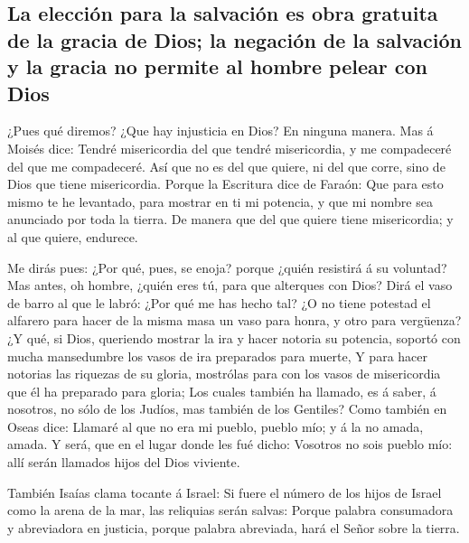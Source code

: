 \hypertarget{la-elecciuxf3n-para-la-salvaciuxf3n-es-obra-gratuita-de-la-gracia-de-dios-la-negaciuxf3n-de-la-salvaciuxf3n-y-la-gracia-no-permite-al-hombre-pelear-con-dios}{%
\subsection{La elección para la salvación es obra gratuita de la gracia
de Dios; la negación de la salvación y la gracia no permite al hombre
pelear con
Dios}\label{la-elecciuxf3n-para-la-salvaciuxf3n-es-obra-gratuita-de-la-gracia-de-dios-la-negaciuxf3n-de-la-salvaciuxf3n-y-la-gracia-no-permite-al-hombre-pelear-con-dios}}

 ¿Pues qué diremos? ¿Que hay injusticia en Dios? En ninguna
manera.  Mas á Moisés dice: Tendré misericordia del que
tendré misericordia, y me compadeceré del que me compadeceré.
 Así que no es del que quiere, ni del que corre, sino de
Dios que tiene misericordia.  Porque la Escritura dice de
Faraón: Que para esto mismo te he levantado, para mostrar en ti mi
potencia, y que mi nombre sea anunciado por toda la tierra.
 De manera que del que quiere tiene misericordia; y al que
quiere, endurece.

 Me dirás pues: ¿Por qué, pues, se enoja? porque ¿quién
resistirá á su voluntad?  Mas antes, oh hombre, ¿quién eres
tú, para que alterques con Dios? Dirá el vaso de barro al que le labró:
¿Por qué me has hecho tal?  ¿O no tiene potestad el
alfarero para hacer de la misma masa un vaso para honra, y otro para
vergüenza?  ¿Y qué, si Dios, queriendo mostrar la ira y
hacer notoria su potencia, soportó con mucha mansedumbre los vasos de
ira preparados para muerte,  Y para hacer notorias las
riquezas de su gloria, mostrólas para con los vasos de misericordia que
él ha preparado para gloria;  Los cuales también ha
llamado, es á saber, á nosotros, no sólo de los Judíos, mas también de
los Gentiles?  Como también en Oseas dice: Llamaré al que
no era mi pueblo, pueblo mío; y á la no amada, amada.  Y
será, que en el lugar donde les fué dicho: Vosotros no sois pueblo mío:
allí serán llamados hijos del Dios viviente.

 También Isaías clama tocante á Israel: Si fuere el número
de los hijos de Israel como la arena de la mar, las reliquias serán
salvas:  Porque palabra consumadora y abreviadora en
justicia, porque palabra abreviada, hará el Señor sobre la tierra.


